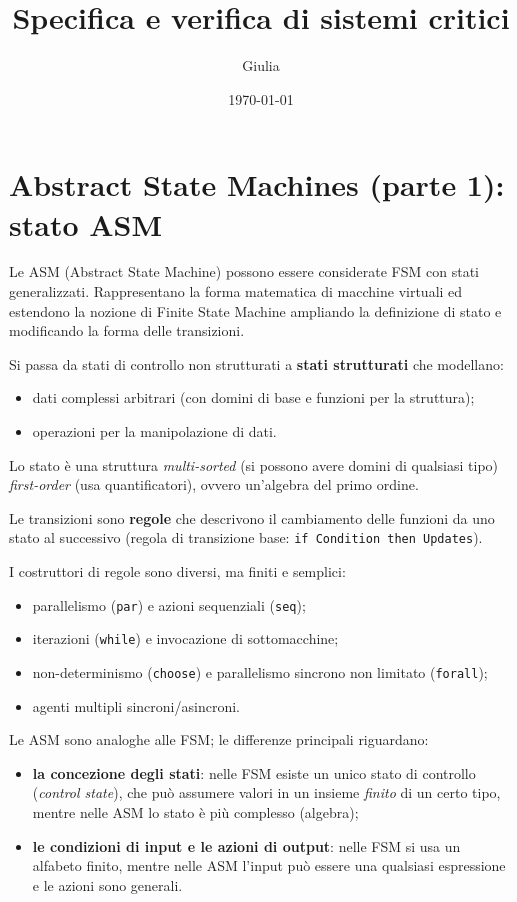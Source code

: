 \documentclass{article}
\title{Specifica e verifica di sistemi critici}
\author{Giulia}
\date{\today}
\begin{document}
\maketitle

\section{Abstract State Machines (parte 1): stato ASM}

Le ASM (Abstract State Machine) possono essere considerate FSM con stati generalizzati.
Rappresentano la forma matematica di macchine virtuali ed estendono la nozione di
Finite State Machine ampliando la definizione di stato e modificando la forma delle transizioni.

Si passa da stati di controllo non strutturati a \textbf{stati strutturati} che modellano:
\begin{itemize}
    \item dati complessi arbitrari (con domini di base e funzioni per la struttura);
    \item operazioni per la manipolazione di dati.
\end{itemize}

Lo stato è una struttura \emph{multi-sorted} (si possono avere domini di qualsiasi tipo)
\emph{first-order} (usa quantificatori), ovvero un'algebra del primo ordine.

Le transizioni sono \textbf{regole} che descrivono il cambiamento delle funzioni da uno
stato al successivo (regola di transizione base: \texttt{if Condition then Updates}).

I costruttori di regole sono diversi, ma finiti e semplici:
\begin{itemize}
    \item parallelismo (\texttt{par}) e azioni sequenziali (\texttt{seq});
    \item iterazioni (\texttt{while}) e invocazione di sottomacchine;
    \item non-determinismo (\texttt{choose}) e parallelismo sincrono non limitato (\texttt{forall});
    \item agenti multipli sincroni/asincroni.
\end{itemize}

Le ASM sono analoghe alle FSM; le differenze principali riguardano:
\begin{itemize}
    \item \textbf{la concezione degli stati}: nelle FSM esiste un unico stato di controllo
    (\emph{control state}), che può assumere valori in un insieme \emph{finito} di un certo
    tipo, mentre nelle ASM lo stato è più complesso (algebra);
    \item \textbf{le condizioni di input e le azioni di output}: nelle FSM si usa un alfabeto
    finito, mentre nelle ASM l'input può essere una qualsiasi espressione e le azioni sono generali.
\end{itemize}
\end{document}
